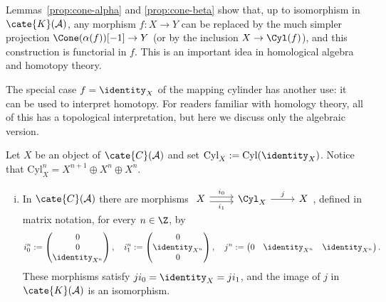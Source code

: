 Lemmas~\ref{prop:cone-alpha} and \ref{prop:cone-beta} show that, up to
isomorphism in $\cate{K}(\mathcal{A})$, any morphism $f:X\to Y$ can be
replaced by the much simpler projection $\Cone(\alpha(f))[-1]\to Y$ (or by
the inclusion $X\to\Cyl(f)$), and this construction is functorial in $f$.
This is an important idea in homological algebra and homotopy theory.

The special case $f=\identity_X$ of the mapping cylinder has another use: it
can be used to interpret homotopy. For readers familiar with homology theory,
all of this has a topological interpretation, but here we discuss only the
algebraic version.

\begin{proposition}\label{prop:cylinder-homotopy}
	Let $X$ be an object of $\cate{C}(\mathcal{A})$ and set
	$\mathrm{Cyl}_X:=\mathrm{Cyl}(\identity_X)$. Notice that
	$\mathrm{Cyl}_X^n=X^{n+1}\oplus X^n\oplus X^n$.
	\begin{enumerate}[(i)]
		\item In $\cate{C}(\mathcal{A})$ there are morphisms
		$\begin{tikzcd}
			X \arrow[shift left, r, "i_0"] \arrow[shift right, r, "i_1"'] & \Cyl_X \arrow[r, "j"] & X
		\end{tikzcd}$,
		defined in matrix notation, for every $n\in\Z$, by
		\begin{equation*}
			i_0^n := \begin{pmatrix} 0 \\ 0 \\ \identity_{X^n} \end{pmatrix} , \quad
			i_1^n := \begin{pmatrix} 0 \\ \identity_{X^n} \\ 0 \end{pmatrix} , \quad j^n := \begin{pmatrix} 0 & \identity_{X^n} & \identity_{X^n} \end{pmatrix}.
		\end{equation*}
		These morphisms satisfy $ji_0=\identity_X=ji_1$, and the image of $j$
		in $\cate{K}(\mathcal{A})$ is an isomorphism.

\end{enumerate}
\end{proposition}

